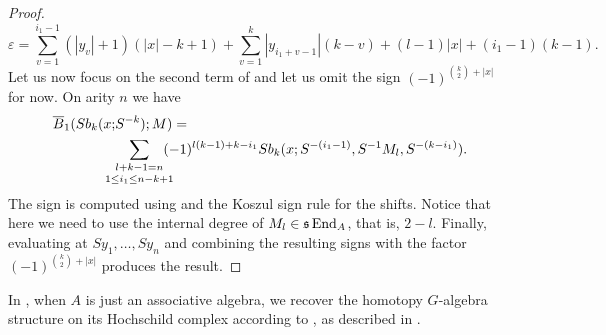 \documentclass[Thesis.tex]{subfiles}
\begin{document}
\begin{proof}
\[
\varepsilon = \sum_{v=1}^{i_1-1}(|y_v|+1)(|x|-k+1)+\sum_{v=1}^{k}|y_{i_1+v-1}|(k-v)+(l-1)|x|+(i_1-1)(k-1).
\]
Let us now focus on the second term of  and let us omit the sign $(-1)^{\binom{k}{2}+|x|}$ for now. On arity $n$ we have
\begin{align*}
\overline{B}_1(Sb_{k}(x;&S^{-k});M)=\\ &\underset{\mathclap{1\leq i_1\leq n-k+1}}{\sum_{l+k-1=n}}(-1)^{l(k-1)+k-i_1} Sb_k(x;S^{-(i_1-1)}, S^{-1}M_l, S^{-(k - i_1)}).
\end{align*}
The sign is computed using  and the Koszul sign rule for the shifts. Notice that here we need to use the internal degree of $M_l\in\mathfrak{s}\operatorname{End}_A$, that is, $2-l$. Finally, evaluating at $Sy_1,\dots, Sy_n$ and combining the resulting signs with the factor $(-1)^{\binom{k}{2}+|x|}$ produces the result.
\end{proof}


\begin{remark}
In , when $A$ is just an associative algebra, we recover the homotopy $G$-algebra structure on its Hochschild complex according to , as described in \cite{GV}.
\end{remark}








%
%
\end{document}

